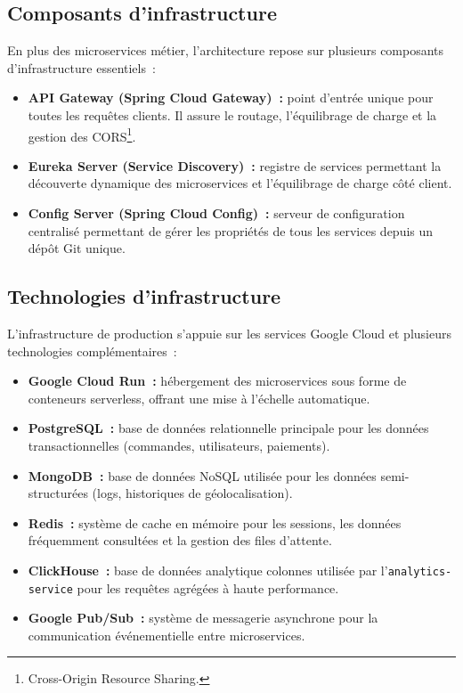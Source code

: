 \subsection{Composants d'infrastructure}
\label{subsec:composants-infrastructure}

En plus des microservices métier, l'architecture repose sur plusieurs composants d'infrastructure essentiels~:

\begin{itemize}
    \item \textbf{API Gateway (Spring Cloud Gateway)~:} point d'entrée unique pour toutes les requêtes clients. Il assure le routage, l'équilibrage de charge et la gestion des CORS\footnote{Cross-Origin Resource Sharing.}.
    \item \textbf{Eureka Server (Service Discovery)~:} registre de services permettant la découverte dynamique des microservices et l'équilibrage de charge côté client.
    \item \textbf{Config Server (Spring Cloud Config)~:} serveur de configuration centralisé permettant de gérer les propriétés de tous les services depuis un dépôt Git unique.
\end{itemize}

\subsection{Technologies d'infrastructure}
\label{subsec:technologies-infrastructure}

L'infrastructure de production s'appuie sur les services Google Cloud et plusieurs technologies complémentaires~:

\begin{itemize}
    \item \textbf{Google Cloud Run~:} hébergement des microservices sous forme de conteneurs serverless, offrant une mise à l'échelle automatique.
    \item \textbf{PostgreSQL~:} base de données relationnelle principale pour les données transactionnelles (commandes, utilisateurs, paiements).
    \item \textbf{MongoDB~:} base de données NoSQL utilisée pour les données semi-structurées (logs, historiques de géolocalisation).
    \item \textbf{Redis~:} système de cache en mémoire pour les sessions, les données fréquemment consultées et la gestion des files d'attente.
    \item \textbf{ClickHouse~:} base de données analytique colonnes utilisée par l'\texttt{analytics-service} pour les requêtes agrégées à haute performance.
    \item \textbf{Google Pub/Sub~:} système de messagerie asynchrone pour la communication événementielle entre microservices.
\end{itemize}

